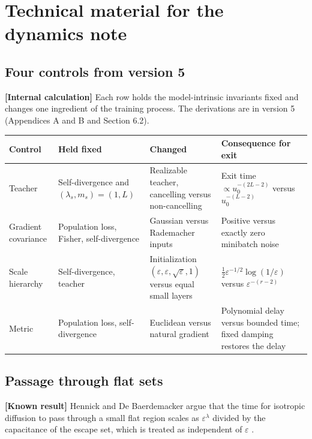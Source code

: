 \documentclass[11pt,a4paper]{article}
\newcommand{\eps}{\varepsilon}
\newcommand{\evl}[2]{{\small\bfseries\color{#1}[#2]}}
\newcommand{\LKnown}{\evl{cknown}{Known result}}
\newcommand{\LCalc}{\evl{ccalc}{Internal calculation}}
\begin{document}
\appendix

\section{Technical material for the dynamics note}
\label{app:p0}
\renewcommand{\theequation}{A.\arabic{equation}}
\setcounter{equation}{0}

\subsection{Four controls from version 5}

\LCalc{} Each row holds the model-intrinsic invariants fixed and changes
one ingredient of the training process. The derivations are in version 5
(Appendices A and B and Section 6.2).

\begin{center}
\begin{tabular}{@{}P{2.3cm}P{3.8cm}P{3.6cm}P{4.8cm}@{}}
\toprule
Control & Held fixed & Changed & Consequence for exit \\
\midrule
Teacher & Self-divergence and $(\lambda_s,m_s)=(1,L)$ & Realizable
teacher, cancelling versus non-cancelling & Exit time
$\propto u_0^{-(2L-2)}$ versus $u_0^{-(L-2)}$ \\ \addlinespace
Gradient covariance & Population loss, Fisher, self-divergence &
Gaussian versus Rademacher inputs & Positive versus exactly zero
minibatch noise \\ \addlinespace
Scale hierarchy & Self-divergence, teacher & Initialization
$(\eps,\eps,\sqrt\eps,1)$ versus equal small layers &
$\tfrac12\eps^{-1/2}\log(1/\eps)$ versus $\eps^{-(r-2)}$ \\ \addlinespace
Metric & Population loss, self-divergence & Euclidean versus natural
gradient & Polynomial delay versus bounded time; fixed damping restores
the delay \\
\bottomrule
\end{tabular}
\end{center}

\subsection{Passage through flat sets}

\LKnown{} Hennick and De Baerdemacker argue that the time for isotropic
diffusion to pass through a small flat region scales as $\eps^\lambda$
divided by the capacitance of the escape set, which is treated as
independent of $\eps$ \cite{hennick2026}.
\end{document}
